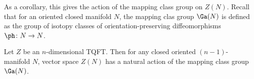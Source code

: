 As a corollary, this gives the action of the mapping class group on $Z(N)$.
Recall that for an oriented  closed manifold $N$, the mapping clas group
 $\Ga(N)$ is defined as the group of isotopy
classes of orientation-preserving diffeomorphisms $\ph \colon N\to N$. 



\begin{corollary}\label{c:mapping-class}
  Let $Z$ be an $n$-dimensional TQFT. Then for any closed  oriented $(n-1)$-manifold 
  $N$,  vector space $Z(N)$ has a natural action of the mapping class group $\Ga(N)$. 
\end{corollary}  

\clearpage

